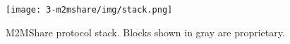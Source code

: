 \begin{figure}[htpb]
  \begin{center}
    \texttt{[image: 3-m2mshare/img/stack.png]}
    \caption{M2MShare protocol stack. Blocks shown in gray are proprietary.\cite{articoloM2MShare}}    
    \label{fig:stack-M2MShare}
  \end{center}
\end{figure}
%
%
%
